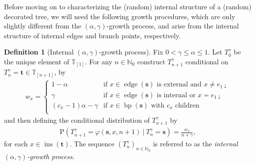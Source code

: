 \documentclass[a4paper, final]{amsart}
\theoremstyle{plain}
\theoremstyle{definition}
\newtheorem{defi}[thm]{Definition}
\newcommand{\tree}[1][t]{\boldsymbol{#1}}
\newcommand{\T}{\mathbb{T}}
\DeclareMathOperator{\edge}{edge}
\DeclareMathOperator{\insertable}{ins}
\DeclareMathOperator{\branchpoints}{bp}
\newcommand{\insertablef}[1][\tree]{\insertable({\tree[#1]})}
\renewcommand{\P}{\mathrm{P}}
\newcommand{\N}{\mathbb{N}}
\begin{document}
Before moving on to characterizing the (random) internal structure of a (random) decorated tree, we will need the following growth procedures, which are only slightly different from the $(\alpha, \gamma)$-growth process, and arise from the internal structure of internal edges and branch points, respectively.
%
\begin{defi}[Internal $(\alpha, \gamma)$-growth process]\label{def:internalalphagammagrowth}
  Fix $0 < \gamma \leq \alpha \leq 1$.
  Let $T_0^\gamma$ be the unique element of $\T_{[1]}$.
  For any $n \in \N_0$ construct $T_{n+1}^\gamma$ conditional on $T_n^\gamma = \tree \in \T_{[n + 1]}$, by
  \begin{align*}
    w_x
    = 
    \begin{cases}
      1 - \alpha & \text{if $x \in \edge \left( \tree[s] \right)$ is external and $x \neq e_{1\downarrow}$} \\
      \gamma & \text{if $x \in \edge \left( \tree[s] \right)$ is internal or $x = e_{1\downarrow}$} \\
      \left( c_x - 1 \right) \alpha - \gamma & \text{if $x \in \branchpoints (\tree[s])$ with $c_x$ children} \\
    \end{cases}
  \end{align*}
  and then defining the conditional distribution of $T_{n+1}^\gamma$ by
  \begin{align*}
    \P \left( T_{n+1}^\gamma = \varphi \left( \tree[s], x, n+1 \right) \ \big \vert \ T_n^\gamma = \tree[s] \right)
    = \frac{w_x}{n + \gamma},
  \end{align*}
  for each $x \in \insertablef[t]$.
  The sequence ${\left( T_n^\gamma \right)}_{n \in \N_0}$ is referred to as the \textit{internal $(\alpha, \gamma)$-growth process}. 
\end{defi}
%
\end{document}

